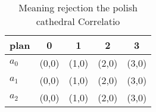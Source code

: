 \documentclass[a4paper]{article}
\begin{document}
\begin{table}
\begin{adjustbox}{width=0.6\columnwidth}
\begin{tabular}{|l|l|l|l|l|}
\hline
\textbf{plan} & \multicolumn{1}{c|}{\textbf{0}} & \multicolumn{1}{c|}{\textbf{1}} & \multicolumn{1}{c|}{\textbf{2}} & \multicolumn{1}{c|}{\textbf{3}} \\ \hline
\textbf{$a_0$}  & (0,0) & (1,0) & (2,0) & (3,0) \\ \hline
\textbf{$a_1$}  & (0,0) & (1,0) & (2,0) & (3,0) \\ \hline
\textbf{$a_2$}  & (0,0) & (1,0) & (2,0) & (3,0) \\ \hline
\end{tabular}
\end{adjustbox}
\caption{Meaning rejection the polish cathedral Correlatio
}
\end{table}
\end{document}
